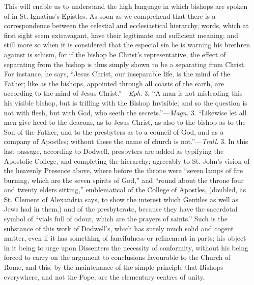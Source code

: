This will enable us to understand the high
language in which bishops are spoken of in St. Ignatius's Epistles. As
soon as we comprehend that there is a correspondence between the
celestial and ecclesiastical hierarchy, words, which at first sight
seem extravagant, have their legitimate and sufficient meaning; and
still more so when it is considered that the especial sin he is
warning his brethren against is schism, for if the bishop be Christ's
representative, the effect of separating from the bishop is thus
simply shown to be a separating from Christ. For instance, he says, ``Jesus
Christ, our inseparable life, is the mind of the Father; like as the
bishops, appointed through all coasts of the earth, are according to
the mind of Jesus Christ.''—\emph{Eph}. 3. ``A man is not misleading
this his visible bishop, but is trifling with the Bishop Invisible;
and so the question is not with flesh, but with God, who seeth the
secrets.''—\emph{Magn}. 3. ``Likewise let all men give heed to the
deacons, as to Jesus Christ, as also to the bishop as to the Son of
the Father, and to the presbyters as to a council of God, and as a
company of Apostles; without these the name of church is not.''—\emph{Trall}.
3. In this last passage, according to Dodwell, presbyters are added as
typifying the Apostolic College, and completing the hierarchy;
agreeably to St. John's vision of the heavenly Presence above, where
before the throne were ``seven lamps of fire burning, which are the
seven spirits of God,'' and ``round about the throne four and twenty
elders sitting,'' emblematical of the College of Apostles,
(doubled, as St. Clement of Alexandria says, to show the interest
which Gentiles as well as Jews had in them,) and of the presbyterate,
because they have the sacerdotal symbol of ``vials full of odour, which
are the prayers of saints.'' Such is the substance of this work of
Dodwell's, which has surely much solid and cogent matter, even if it
has something of fancifulness or refinement in parts; his object in it
being to urge upon Dissenters the necessity of conformity, without his
being forced to carry on the argument to conclusions favourable to the
Church of Rome, and this, by the maintenance of the simple principle
that Bishops everywhere, and not the Pope, are the elementary centres
of unity.

